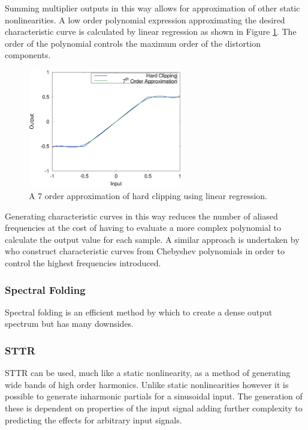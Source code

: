 			Summing multiplier outputs in this way allows for approximation of other static
			nonlinearities. A low order polynomial expression approximating the desired characteristic curve
			is calculated by linear regression as shown in Figure \ref{fig:ClippingApproximation}. The
			order of the polynomial controls the maximum order of the distortion components.

			\begin{figure}[h!]
				\centering
				\includegraphics[width=0.6\textwidth]{chapter5/Images/ClippingApproximation.eps}
				\caption{A 7 order approximation of hard clipping using linear regression.}
				\label{fig:ClippingApproximation}
			\end{figure}

			Generating characteristic curves in this way reduces the number of aliased frequencies at the cost
			of having to evaluate a more complex polynomial to calculate the output value for each sample. A
			similar approach is undertaken by \cite{fernandez-cid2001distortion} who construct characteristic
			curves from Chebyshev polynomials in order to control the highest frequencies introduced.

		\subsubsection*{Spectral Folding}
			Spectral folding is an efficient method by which to create a dense output spectrum but has many
			downsides.

		\subsubsection*{STTR}
			STTR can be used, much like a static nonlinearity, as a method of generating wide bands of
			high order harmonics. Unlike static nonlinearities however it is possible to generate inharmonic
			partials for a sinusoidal input. The generation of these is dependent on properties of the input
			signal adding further complexity to predicting the effects for arbitrary input signals.

